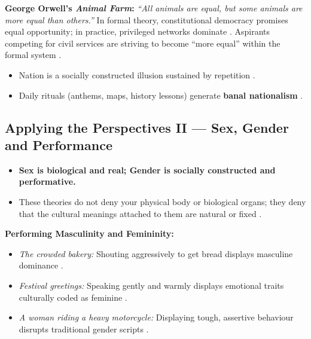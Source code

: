 \begin{CriticalPoint}
\textbf{George Orwell's \textit{Animal Farm}:} \textit{``All animals are equal, but some animals are more equal than others.''}  In formal theory, constitutional democracy promises equal opportunity; in practice, privileged networks dominate . Aspirants competing for civil services are striving to become ``more equal'' within the formal system .
\end{CriticalPoint}

\begin{QuickRevision}
\begin{itemize}
    \item Nation is a socially constructed illusion sustained by repetition .
    \item Daily rituals (anthems, maps, history lessons) generate \textbf{banal nationalism} .
\end{itemize}
\end{QuickRevision}

\subsection{Applying the Perspectives II --- Sex, Gender and Performance}

\begin{KeyConcept}
\begin{itemize}
    \item \textbf{Sex is biological and real; Gender is socially constructed and performative.} 
    \item These theories do not deny your physical body or biological organs; they deny that the cultural meanings attached to them are natural or fixed .
\end{itemize}
\end{KeyConcept}

\begin{ExampleBox}
\textbf{Performing Masculinity and Femininity:}
\begin{itemize}
    \item \textit{The crowded bakery:} Shouting aggressively to get bread displays masculine dominance .
    \item \textit{Festival greetings:} Speaking gently and warmly displays emotional traits culturally coded as feminine .
    \item \textit{A woman riding a heavy motorcycle:} Displaying tough, assertive behaviour disrupts traditional gender scripts .
\end{itemize}
\end{ExampleBox}

